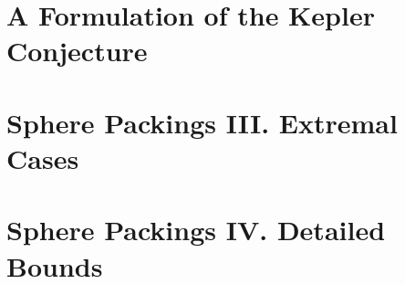 \documentclass[onecolumn]{newsiambook}
\def\shortversion#1{#1}
\def\longversion#1{}
\def\shortversion#1{}
\def\longversion#1{#1}
\def\skipversion#1{{}}
\begin{document}

\longversion{
    \part{A Formulation of the Kepler Conjecture}
    
    }
    \label{part:form}
    
    


\longversion{
    \part{Sphere Packings III. Extremal Cases}
    \label{part:iii}
    
    
    
    }
\shortversion{}


\longversion{
    \part{Sphere Packings IV. Detailed Bounds}
    \label{part:bounds}
    
    
    }


\skipversion{ %
    \part{Sphere Packings V. Pentahedral Prisms -- Ferguson}
    \label{part:ferguson}
    \chapter*{Introduction}
    
    
    }
    
\end{document}
